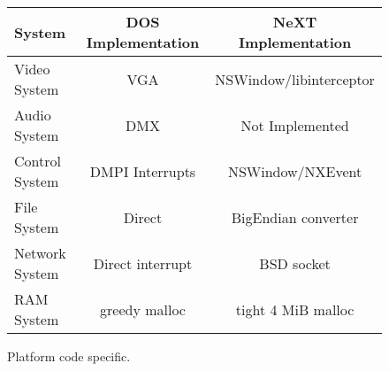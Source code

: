  \begin{figure}[H]
\centering  
\begin{tabularx}{\textwidth}{ L{0.22} | C{0.39} | C{0.39} }
  \toprule
  \textbf{System} & \textbf{DOS Implementation} & \textbf{NeXT Implementation}\\
  \toprule 
    Video System & VGA & NSWindow/libinterceptor\\
    Audio System & DMX & Not Implemented\\
    Control System & DMPI Interrupts & NSWindow/NXEvent \\
    File  System & Direct & BigEndian converter\\
    Network System & Direct interrupt & BSD socket \\
    RAM System & greedy malloc & tight 4 MiB malloc\\
   \toprule
\end{tabularx}
\caption{Platform code specific.}
\end{figure}

\par

\\


\par



